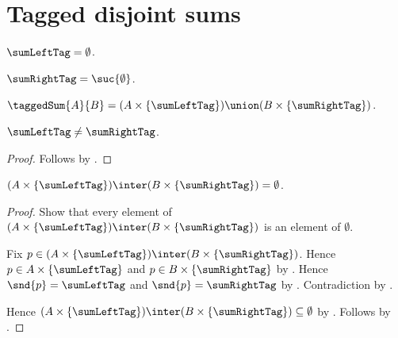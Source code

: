 



\section{Tagged disjoint sums}

\begin{definition}\label{sum_left_tag}
    $\sumLeftTag=\emptyset$.
\end{definition}

\begin{definition}\label{sum_right_tag}
    $\sumRightTag=\suc{\emptyset}$.
\end{definition}

\begin{definition}\label{tagged_sum}
    $\taggedSum{A}{B}
        =(A\times\{\sumLeftTag\})\union
            (B\times\{\sumRightTag\})$.
\end{definition}

\begin{proposition}\label{sum_tags_distinct}
    $\sumLeftTag\neq\sumRightTag$.
\end{proposition}
\begin{proof}
    Follows by .
\end{proof}

\begin{proposition}\label{tagged_sum_components_disjoint}
    $(A\times\{\sumLeftTag\})\inter
        (B\times\{\sumRightTag\})=\emptyset$.
\end{proposition}
\begin{proof}
    Show that every element of
        $(A\times\{\sumLeftTag\})\inter
            (B\times\{\sumRightTag\})$ is an element of $\emptyset$.
    \begin{subproof}
        Fix $p\in
            (A\times\{\sumLeftTag\})\inter
                (B\times\{\sumRightTag\})$.
        Hence $p\in A\times\{\sumLeftTag\}$ and
            $p\in B\times\{\sumRightTag\}$ by .
        Hence $\snd{p}=\sumLeftTag$ and $\snd{p}=\sumRightTag$
            by .
        Contradiction by .
    \end{subproof}
    Hence
        $(A\times\{\sumLeftTag\})\inter
            (B\times\{\sumRightTag\})\subseteq\emptyset$
        by .
    Follows by .
\end{proof}

